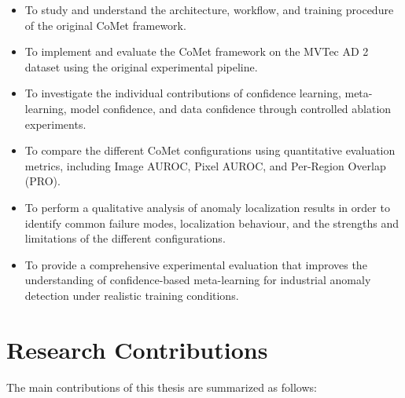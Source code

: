 \documentclass[12pt,openany,oneside]{book}
\begin{document}
\begin{itemize}
    \item To study and understand the architecture, workflow, and training procedure of the original CoMet framework.
    
    \item To implement and evaluate the CoMet framework on the MVTec AD 2 dataset using the original experimental pipeline.
    
    \item To investigate the individual contributions of confidence learning, meta-learning, model confidence, and data confidence through controlled ablation experiments.
    
    \item To compare the different CoMet configurations using quantitative evaluation metrics, including Image AUROC, Pixel AUROC, and Per-Region Overlap (PRO).
    
    \item To perform a qualitative analysis of anomaly localization results in order to identify common failure modes, localization behaviour, and the strengths and limitations of the different configurations.
    
    \item To provide a comprehensive experimental evaluation that improves the understanding of confidence-based meta-learning for industrial anomaly detection under realistic training conditions.


\end{itemize}
\section{Research Contributions}

The main contributions of this thesis are summarized as follows:
\end{document}
